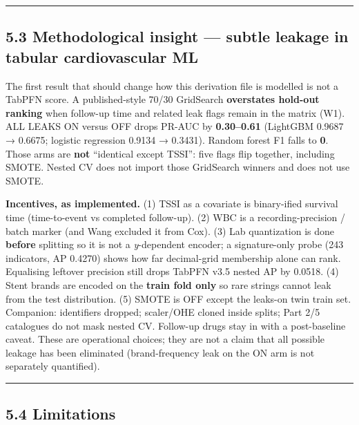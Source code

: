 \documentclass[
]{article}
\begin{document}
\begin{center}\rule{0.5\linewidth}{0.5pt}\end{center}

\subsection{5.3 Methodological insight --- subtle leakage in tabular
cardiovascular
ML}\label{methodological-insight-subtle-leakage-in-tabular-cardiovascular-ml}

The first result that should change how this derivation file is modelled
is not a TabPFN score. A published-style 70/30 GridSearch
\textbf{overstates hold-out ranking} when follow-up time and related
leak flags remain in the matrix (W1). ALL LEAKS ON versus OFF drops
PR-AUC by \textbf{0.30--0.61} (LightGBM 0.9687 → 0.6675; logistic
regression 0.9134 → 0.3431). Random forest F1 falls to \textbf{0}. Those
arms are \textbf{not} ``identical except TSSI'': five flags flip
together, including SMOTE. Nested CV does not import those GridSearch
winners and does not use SMOTE.

\textbf{Incentives, as implemented.} (1) TSSI as a covariate is
binary-ified survival time (time-to-event vs completed follow-up). (2)
WBC is a recording-precision / batch marker (and Wang excluded it from
Cox). (3) Lab quantization is done \textbf{before} splitting so it is
not a \emph{y}-dependent encoder; a signature-only probe (243
indicators, AP 0.4270) shows how far decimal-grid membership alone can
rank. Equalising leftover precision still drops TabPFN v3.5 nested AP by
0.0518. (4) Stent brands are encoded on the \textbf{train fold only} so
rare strings cannot leak from the test distribution. (5) SMOTE is OFF
except the leaks-on twin train set. Companion: identifiers dropped;
scaler/OHE cloned inside splits; Part 2/5 catalogues do not mask nested
CV. Follow-up drugs stay in with a post-baseline caveat. These are
operational choices; they are not a claim that all possible leakage has
been eliminated (brand-frequency leak on the ON arm is not separately
quantified).

\begin{center}\rule{0.5\linewidth}{0.5pt}\end{center}

\subsection{5.4 Limitations}\label{limitations}
\end{document}
